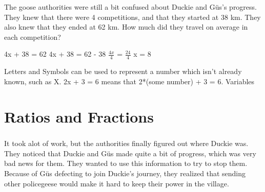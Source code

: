 \documentclass[a4paper,11pt ]{book}
\begin{document}
{}
{The goose authorities were still a bit confused about Duckie and Güs's progress. They knew that there were 4 competitions, and that they started at 38 km. They also knew that they ended at 62 km. How much did they travel on average in each competition?}
{\begin{center} 4x + 38 = 62 \linebreak 4x + 38 = 62 - 38 \linebreak $\frac{4x}{4}$ = $\frac{24}{4}$ \linebreak x = $8$  \end{center}}
{Letters and Symbols can be used to represent a number which isn’t already known, such as X. 2x + 3 = 6 means that 2*(some number) + 3 = 6.}
{Variables}
\chapter{Ratios and Fractions}
\paragraph{} It took alot of work, but the authorities finally figured out where Duckie was. They noticed that Duckie and Güs made quite a bit of progress, which was very bad news for them. They wanted to use this information to try to stop them. Because of Güs defecting to join Duckie's journey, they realized that sending other policegeese would make it hard to keep their power in the village. 
\end{document}

